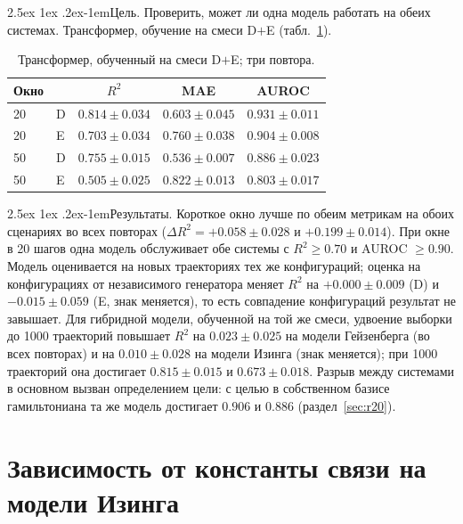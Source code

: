 \documentclass[12pt,a4paper]{report}
\makeatletter
\renewcommand\paragraph{\@startsection{paragraph}{4}{\z@}%
  {2.5ex \@plus1ex \@minus.2ex}{-1em}{\normalfont\normalsize\bfseries}}
\numberwithin{equation}{chapter}
\makeatother
\begin{document}
\paragraph{Цель.} Проверить, может ли одна модель работать на обеих системах.
Трансформер, обучение на смеси D$+$E (табл.~\ref{tab:e11}).

\begin{table}[h]
\centering
\caption{Трансформер, обученный на смеси D$+$E; три повтора.}
\label{tab:e11}
\small
\begin{tabular}{@{}llccc@{}}
\toprule
Окно & & $R^2$ & MAE & AUROC \\
\midrule
20 & D & $\mathbf{0.814\pm0.034}$ & $0.603\pm0.045$ & $\mathbf{0.931\pm0.011}$ \\
20 & E & $\mathbf{0.703\pm0.034}$ & $0.760\pm0.038$ & $\mathbf{0.904\pm0.008}$ \\
50 & D & $0.755\pm0.015$ & $0.536\pm0.007$ & $0.886\pm0.023$ \\
50 & E & $0.505\pm0.025$ & $0.822\pm0.013$ & $0.803\pm0.017$ \\
\bottomrule
\end{tabular}
\end{table}

\paragraph{Результаты.} Короткое окно лучше по обеим метрикам на обоих
сценариях во всех повторах ($\Delta R^2=+0.058\pm0.028$ и $+0.199\pm0.014$).
При окне в 20 шагов одна модель обслуживает обе системы с $R^2\ge0.70$ и
AUROC $\ge0.90$. Модель оценивается на новых траекториях тех же конфигураций;
оценка на конфигурациях от независимого генератора меняет $R^2$ на
$+0.000\pm0.009$ (D) и $-0.015\pm0.059$ (E, знак меняется), то есть совпадение конфигураций
результат не завышает. Для гибридной модели, обученной на той же смеси,
удвоение выборки до 1000 траекторий повышает $R^2$ на $0.023\pm0.025$ на
модели Гейзенберга (во всех повторах) и на $0.010\pm0.028$ на модели Изинга
(знак меняется); при 1000 траекторий она достигает $0.815\pm0.015$ и
$0.673\pm0.018$. Разрыв между системами в основном вызван определением
цели: с целью в собственном базисе гамильтониана та же модель достигает
$0.906$ и $0.886$ (раздел~\ref{sec:r20}).

\section{Зависимость от константы связи на модели Изинга}
\label{sec:r5}
\end{document}
